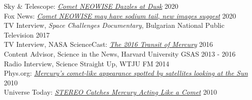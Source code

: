 \documentclass[12pt]{report}
\begin{document}
\noindent Sky \& Telescope: \href{https://skyandtelescope.org/astronomy-news/comet-neowise-dazzles-at-dusk/}{{\it Comet NEOWISE Dazzles at Dusk}} \hfill 2020\\
\noindent Fox News: \href{https://www.foxnews.com/science/comet-neowise-may-have-sodium-tail}{{\it Comet NEOWISE may have sodium tail, new images suggest}} \hfill 2020\\
\noindent TV Interview, {\it Space Challenges Documentary}, Bulgarian National Public Television \hfill 2017\\
\noindent TV Interview, NASA ScienceCast: \href{https://www.youtube.com/watch?v=Gibaxh9x7O0&ab_channel=ScienceAtNASA}{{\it The 2016 Transit of Mercury}} \hfill 2016\\
\noindent Content Advisor, Science in the News, Harvard University GSAS \hfill 2013 - 2016\\
\noindent Radio Interview, Science Straight Up, WTJU FM \hfill 2014\\
\noindent Phys.org: \href{https://phys.org/news/2010-09-mercury-comet-like-satellites-sun.html}{{\it Mercury's comet-like appearance spotted by satellites looking at the Sun}} \hfill 2010\\
\noindent Universe Today: \href{https://www.universetoday.com/74279/stereo-catches-mercury-acting-like-a-comet/}{{\it STEREO Catches Mercury Acting Like a Comet}} \hfill 2010\\
\end{document}
